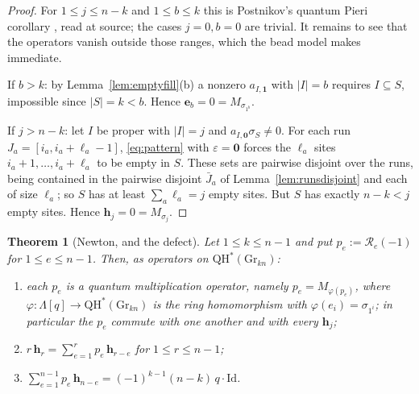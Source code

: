 \documentclass[11pt]{article}
\theoremstyle{plain}
\newtheorem{theorem}{Theorem}
\theoremstyle{definition}
\newcommand{\QH}{\mathrm{QH}^*}
\newcommand{\Gr}{\mathrm{Gr}}
\newcommand{\Lam}{\Lambda}
\newcommand{\bh}{\mathbf h}
\newcommand{\be}{\mathbf e}
\begin{document}
\begin{proof}
For $1\le j\le n-k$ and $1\le b\le k$ this is Postnikov's quantum Pieri
corollary \cite[\texttt{cor:pieri-AN}, ll.2935--2947]{Pos}, read at source; the
cases $j=0,b=0$ are trivial.  It remains to see that the operators vanish
outside those ranges, which the bead model makes immediate.

If $b>k$: by Lemma~\ref{lem:emptyfill}(b) a nonzero $a_{I,\mathbf 1}$ with
$|I|=b$ requires $I\subseteq S$, impossible since $|S|=k<b$.  Hence
$\be_b=0=M_{\sigma_{1^b}}$.

If $j>n-k$: let $I$ be proper with $|I|=j$ and $a_{I,\mathbf 0}\sigma_S\ne0$.
For each run $J_a=[i_a,i_a+\ell_a-1]$, \eqref{eq:pattern} with
$\varepsilon=\mathbf 0$ forces the $\ell_a$ sites
$i_a+1,\dots,i_a+\ell_a$ to be empty in $S$.  These sets are pairwise disjoint
over the runs, being contained in the pairwise disjoint $\bar J_a$ of
Lemma~\ref{lem:runsdisjoint} and each of size $\ell_a$; so $S$ has at least
$\sum_a\ell_a=j$ empty sites.  But $S$ has exactly $n-k<j$ empty sites.  Hence
$\bh_j=0=M_{\sigma_j}$.
\end{proof}

\begin{theorem}[Newton, and the defect]\label{thm:newton}
Let $1\le k\le n-1$ and put $p_e:=\mathcal R_e(-1)$ for $1\le e\le n-1$.  Then,
as operators on $\QH(\Gr_{kn})$:
\begin{enumerate}
\item[(i)] each $p_e$ is a quantum multiplication operator, namely
  $p_e=M_{\varphi(p_e)}$, where $\varphi:\Lam[q]\to\QH(\Gr_{kn})$ is the ring
  homomorphism with $\varphi(e_i)=\sigma_{1^i}$; in particular the $p_e$ commute
  with one another and with every $\bh_j$;
\item[(ii)] $\displaystyle r\,\bh_r=\sum_{e=1}^{r}p_e\,\bh_{r-e}$ for
  $1\le r\le n-1$;
\item[(iii)] $\displaystyle\sum_{e=1}^{n-1}p_e\,\bh_{n-e}
  =(-1)^{k-1}(n-k)\,q\cdot\mathrm{Id}$.
\end{enumerate}
\end{theorem}
\end{document}
